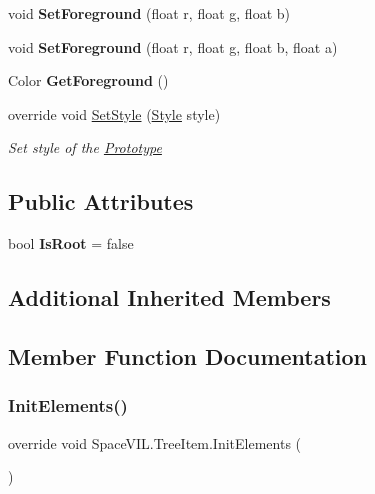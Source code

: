 \begin{DoxyCompactItemize}
void {\bfseries Set\+Foreground} (float r, float g, float b)
\item 
\mbox{\label{class_space_v_i_l_1_1_tree_item_a0b4830add8fc7dd697aed6572a210569}} 
void {\bfseries Set\+Foreground} (float r, float g, float b, float a)
\item 
\mbox{\label{class_space_v_i_l_1_1_tree_item_acc4304b0f348207ce7699216448c2881}} 
Color {\bfseries Get\+Foreground} ()
\item 
override void \mbox{\hyperlink{class_space_v_i_l_1_1_tree_item_ab12f4f097b10e2a0c7f0b5fd311449d4}{Set\+Style}} (\mbox{\hyperlink{class_space_v_i_l_1_1_decorations_1_1_style}{Style}} style)
\begin{DoxyCompactList}\small\item\em Set style of the \mbox{\hyperlink{class_space_v_i_l_1_1_prototype}{Prototype}} \end{DoxyCompactList}\end{DoxyCompactItemize}
\subsection*{Public Attributes}
\begin{DoxyCompactItemize}
\item 
\mbox{\label{class_space_v_i_l_1_1_tree_item_a63fa934ac6621555237878002d12d17b}} 
bool {\bfseries Is\+Root} = false
\end{DoxyCompactItemize}
\subsection*{Additional Inherited Members}


\subsection{Member Function Documentation}
\mbox{\label{class_space_v_i_l_1_1_tree_item_a4f40a1de34aa41b1eff340f98de81756}} 
\subsubsection{\texorpdfstring{Init\+Elements()}{InitElements()}}
{\footnotesize\ttfamily override void Space\+V\+I\+L.\+Tree\+Item.\+Init\+Elements (\begin{DoxyParamCaption}{ }\end{DoxyParamCaption})\hspace{0.3cm}{\ttfamily [virtual]}}



